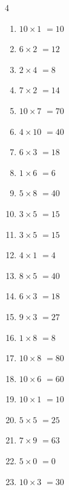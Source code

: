 \begin{multicols}{4}
\begin{enumerate}
  \item $10\times 1$
        $=10$

  \item $6\times 2$
        $=12$

  \item $2\times 4$
        $=8$

  \item $7\times 2$
        $=14$

  \item $10\times 7$
        $=70$

  \item $4\times 10$
        $=40$

  \item $6\times 3$
        $=18$

  \item $1\times 6$
        $=6$

  \item $5\times 8$
        $=40$

  \item $3\times 5$
        $=15$

  \item $3\times 5$
        $=15$

  \item $4\times 1$
        $=4$

  \item $8\times 5$
        $=40$

  \item $6\times 3$
        $=18$

  \item $9\times 3$
        $=27$

  \item $1\times 8$
        $=8$

  \item $10\times 8$
        $=80$

\columnbreak %

  \item $10\times 6$
        $=60$

  \item $10\times 1$
        $=10$

  \item $5\times 5$
        $=25$

  \item $7\times 9$
        $=63$

  \item $5\times 0$
        $=0$

  \item $10\times 3$
        $=30$


\end{enumerate}
\end{multicols}
